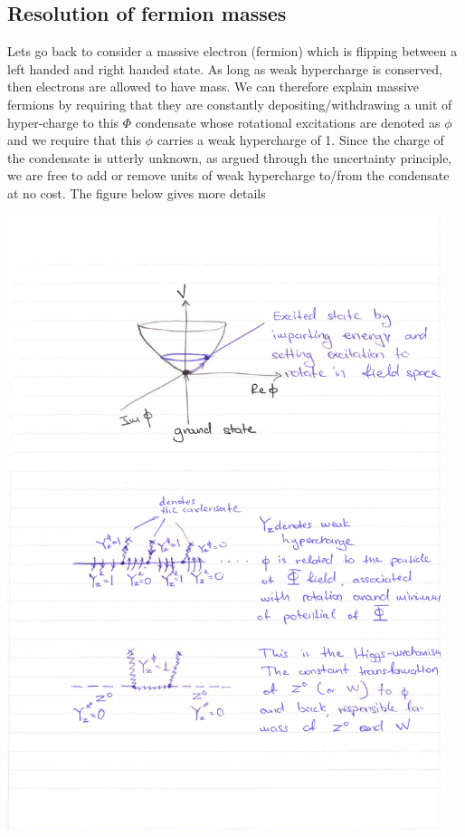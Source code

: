 \subsection{Resolution of fermion masses}
Lets go back to consider a massive electron (fermion) which is flipping between a left handed and right handed state. As long as weak hypercharge is conserved, then electrons are allowed to have mass. We can therefore explain massive fermions by requiring that they are constantly depositing/withdrawing a unit of hyper-charge to this $\Phi$ condensate whose rotational excitations are denoted as $\phi$ and we require that this $\phi$ carries a weak hypercharge of 1. Since the charge of the condensate is utterly unknown, as argued through the uncertainty principle, we are free to add or remove units of weak hypercharge to/from the condensate at no cost. The figure below gives more details
\begin{center}
\includegraphics[width=0.95\textwidth]{fig/higgs/fermion_mass.pdf}
\end{center}

